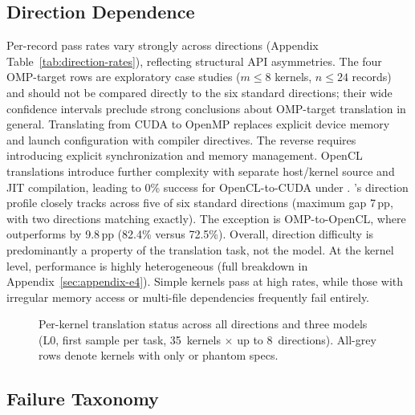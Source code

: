 \subsection{Direction Dependence}
\label{sec:direction-analysis}

Per-record pass rates vary strongly across directions (Appendix Table~\ref{tab:direction-rates}), reflecting structural API asymmetries. The four OMP-target rows are exploratory case studies ($m \leq 8$ kernels, $n \leq 24$ records) and should not be compared directly to the six standard directions; their wide confidence intervals preclude strong conclusions about OMP-target translation in general. Translating from CUDA to OpenMP replaces explicit device memory and launch configuration with compiler directives. The reverse requires introducing explicit synchronization and memory management. OpenCL translations introduce further complexity with separate host/kernel source and JIT compilation, leading to 0\% success for OpenCL-to-CUDA under \qwenshort{}. \codex{}'s direction profile closely tracks \gptnew{} across five of six standard directions (maximum gap 7\,pp, with two directions matching exactly). The exception is OMP-to-OpenCL, where \codex{} outperforms \gptnew{} by 9.8\,pp (82.4\% versus 72.5\%). Overall, direction difficulty is predominantly a property of the translation task, not the model. At the kernel level, performance is highly heterogeneous (full breakdown in Appendix~\ref{sec:appendix-e4}). Simple kernels pass at high rates, while those with irregular memory access or multi-file dependencies frequently fail entirely.

\begin{figure}[t]
  \centering
  
  \caption{Per-kernel translation status across all directions and three models (L0, first sample per task, 35~kernels $\times$ up to 8~directions). All-grey rows denote kernels with only \knownfail{} or phantom specs.}
  \label{fig:kernel-heatmap-unified}
\end{figure}

\subsection{Failure Taxonomy}
\label{sec:failure-taxonomy}

